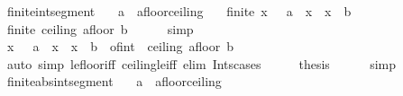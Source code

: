 \begin{isabellebody}
\endisatagproof
{\isafoldproof}%
%
\isadelimproof
\isanewline
%
\endisadelimproof
\isanewline
{}\isamarkupfalse%
\ finite{\isacharunderscore}{\kern0pt}int{\isacharunderscore}{\kern0pt}segment{\isacharcolon}{\kern0pt}\isanewline
\ \ \ a\ {\isacharcolon}{\kern0pt}{\isacharcolon}{\kern0pt}\ {\isachardoublequoteopen}{\isacharprime}{\kern0pt}a{\isacharcolon}{\kern0pt}{\isacharcolon}{\kern0pt}floor{\isacharunderscore}{\kern0pt}ceiling{\isachardoublequoteclose}\isanewline
\ \ \ {\isachardoublequoteopen}finite\ {\isacharbraceleft}{\kern0pt}x\ {\isasymin}\ {\isasymint}{\isachardot}{\kern0pt}\ a\ {\isasymle}\ x\ {\isasymand}\ x\ {\isasymle}\ b{\isacharbraceright}{\kern0pt}{\isachardoublequoteclose}\isanewline
%
\isadelimproof
%
\endisadelimproof
%
\isatagproof
{}\isamarkupfalse%
\ {\isacharminus}{\kern0pt}\isanewline
\ \ \isamarkupfalse%
\ {\isachardoublequoteopen}finite\ {\isacharbraceleft}{\kern0pt}ceiling\ a{\isachardot}{\kern0pt}{\isachardot}{\kern0pt}floor\ b{\isacharbraceright}{\kern0pt}{\isachardoublequoteclose}\isanewline
\ \ \ \ \isamarkupfalse%
\ simp\isanewline
\ \ \isamarkupfalse%
\ \isamarkupfalse%
\ {\isachardoublequoteopen}{\isacharbraceleft}{\kern0pt}x\ {\isasymin}\ {\isasymint}{\isachardot}{\kern0pt}\ a\ {\isasymle}\ x\ {\isasymand}\ x\ {\isasymle}\ b{\isacharbraceright}{\kern0pt}\ {\isacharequal}{\kern0pt}\ of{\isacharunderscore}{\kern0pt}int\ {\isacharbackquote}{\kern0pt}\ {\isacharbraceleft}{\kern0pt}ceiling\ a{\isachardot}{\kern0pt}{\isachardot}{\kern0pt}floor\ b{\isacharbraceright}{\kern0pt}{\isachardoublequoteclose}\isanewline
\ \ \ \ \isamarkupfalse%
\ {\isacharparenleft}{\kern0pt}auto\ simp{\isacharcolon}{\kern0pt}\ le{\isacharunderscore}{\kern0pt}floor{\isacharunderscore}{\kern0pt}iff\ ceiling{\isacharunderscore}{\kern0pt}le{\isacharunderscore}{\kern0pt}iff\ elim{\isacharbang}{\kern0pt}{\isacharcolon}{\kern0pt}\ Ints{\isacharunderscore}{\kern0pt}cases{\isacharparenright}{\kern0pt}\isanewline
\ \ \isamarkupfalse%
\ \isamarkupfalse%
\ {\isacharquery}{\kern0pt}thesis\isanewline
\ \ \ \ \isamarkupfalse%
\ simp\isanewline
{}\isamarkupfalse%
%
\endisatagproof
{\isafoldproof}%
%
\isadelimproof
\isanewline
%
\endisadelimproof
\isanewline
{}\isamarkupfalse%
\ finite{\isacharunderscore}{\kern0pt}abs{\isacharunderscore}{\kern0pt}int{\isacharunderscore}{\kern0pt}segment{\isacharcolon}{\kern0pt}\isanewline
\ \ \ a\ {\isacharcolon}{\kern0pt}{\isacharcolon}{\kern0pt}\ {\isachardoublequoteopen}{\isacharprime}{\kern0pt}a{\isacharcolon}{\kern0pt}{\isacharcolon}{\kern0pt}floor{\isacharunderscore}{\kern0pt}ceiling{\isachardoublequoteclose}\isanewline

\end{isabellebody}
